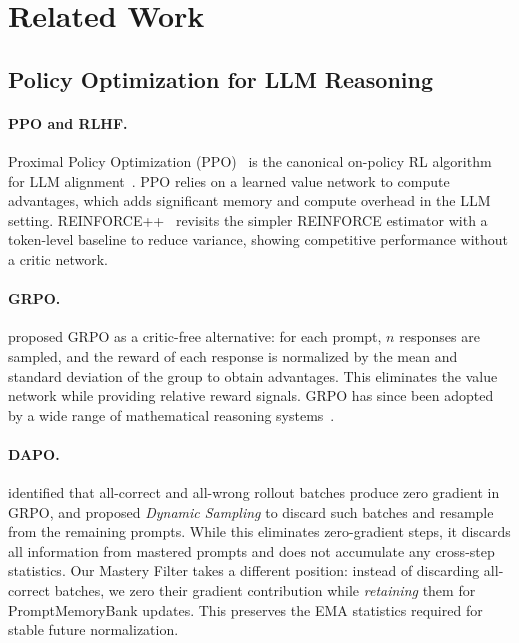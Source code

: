 \documentclass[11pt]{article}
\theoremstyle{definition}
\begin{document}
\section{Related Work}
\label{sec:related}

\subsection{Policy Optimization for LLM Reasoning}

\paragraph{PPO and RLHF.}
Proximal Policy Optimization (PPO)~\citep{schulman2017proximal} is the
canonical on-policy RL algorithm for LLM alignment~\citep{ouyang2022training}.
PPO relies on a learned value network to compute advantages, which adds
significant memory and compute overhead in the LLM setting.
REINFORCE++~\citep{hu2025reinforce} revisits the simpler REINFORCE estimator
with a token-level baseline to reduce variance, showing competitive performance
without a critic network.

\paragraph{GRPO.}
\citet{shao2024deepseekmath} proposed GRPO as a critic-free alternative:
for each prompt, $n$ responses are sampled, and the reward of each response
is normalized by the mean and standard deviation of the group to obtain
advantages.
This eliminates the value network while providing relative reward signals.
GRPO has since been adopted by a wide range of mathematical reasoning
systems~\citep{deepseekr1,qwen2math}.

\paragraph{DAPO.}
\citet{yu2025dapo} identified that all-correct and all-wrong rollout batches
produce zero gradient in GRPO, and proposed \emph{Dynamic Sampling} to
discard such batches and resample from the remaining prompts.
While this eliminates zero-gradient steps, it discards all information from
mastered prompts and does not accumulate any cross-step statistics.
Our Mastery Filter takes a different position: instead of discarding
all-correct batches, we zero their gradient contribution while \emph{retaining}
them for PromptMemoryBank updates.
This preserves the EMA statistics required for stable future normalization.
\end{document}
